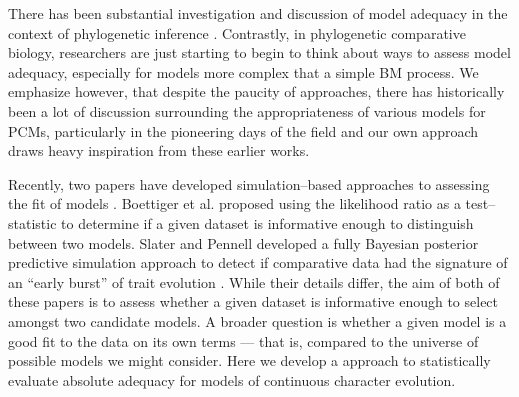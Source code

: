 \documentclass[a4paper,12pt]{article}
\begin{document}
There has been substantial investigation and discussion of model adequacy in the context of phylogenetic inference \citep{SullivanSwofford, Goldman, SandersonKim, Bollback2002, Ripplinger2010, Lewis2013, Reid2013}. Contrastly, in phylogenetic comparative biology, researchers are just starting to begin to think about ways to assess model adequacy, especially for models more complex that a simple BM process. We emphasize however, that despite the paucity of approaches, there has historically been a lot of discussion surrounding the appropriateness of various models for PCMs, particularly in the pioneering days of the field \citep{Felsenstein1985, Felsenstein1988, HarveyPagel1991, Garland1992, Pagel1993, Diaz1996, Price1997, Garland1999, GarlandIves2000, HansenOrzack2005, Hansen2012} and our own approach draws heavy inspiration from these earlier works.

Recently, two papers have developed simulation--based approaches to assessing the fit of models \citep{Boettiger2012, SlaterPennell}. Boettiger et al. \citep{Boettiger2012} proposed using the likelihood ratio as a test--statistic to determine if a given dataset is informative enough to distinguish between two models. Slater and Pennell \citep{SlaterPennell} developed a fully Bayesian posterior predictive simulation approach to detect if comparative data had the signature of an ``early burst'' of trait evolution \citep{FreckletonHarvey2006}. While their details differ, the aim of both of these papers is to assess whether a given dataset is informative enough to select amongst two candidate models. A broader question is whether a given model is a good fit to the data on its own terms --- that is, compared to the universe of possible models we might consider. Here we develop a approach to statistically evaluate absolute adequacy for models of continuous character evolution.
\end{document}
